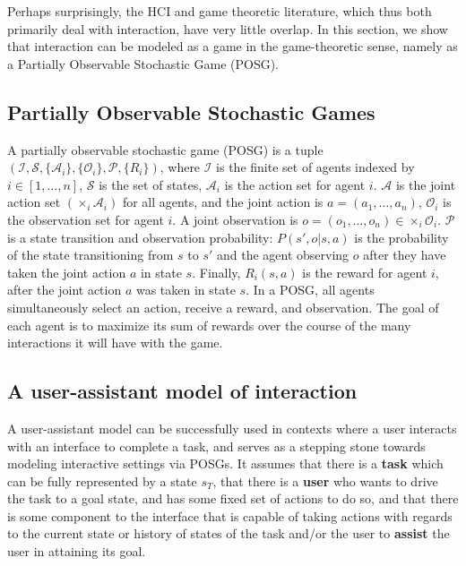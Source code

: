 \documentclass[12pt,a4paper]{article}
\begin{document}
Perhaps surprisingly, the HCI and game theoretic literature, which thus both primarily deal with interaction, have very little overlap. In this section, we show that interaction can be modeled as a game in the game-theoretic sense, namely as a Partially Observable Stochastic Game (POSG).
\subsection{Partially Observable Stochastic Games}
A partially observable stochastic game (POSG) is a tuple $(\mathcal{I}, \mathcal{S}, \lbrace \mathcal{A}_i \rbrace, \lbrace \mathcal{O}_i \rbrace, \mathcal{P}, \lbrace R_i \rbrace )$, where $\mathcal{I}$ is the finite set of agents indexed by $i \in [1,\dots,n]$, $\mathcal{S}$ is the set of states, $\mathcal{A}_i$ is the action set for agent $i$. $\mathcal{A}$ is the joint action set $(\times_{i} \mathcal{A}_i)$ for all agents, and the joint action is $a = (a_1, \dots{}, a_n)$, $\mathcal{O}_i$  is the observation set for agent $i$. A joint observation is $o=(o_1, \dots{}, o_n) \in \times_i \mathcal{O}_i$. $\mathcal{P}$ is a state transition and observation probability: $P(s', o| s, a)$ is the probability of the state transitioning from $s$ to $s'$ and the agent observing $o$ after they have taken the joint action $a$ in state $s$.
Finally, $R_i(s,a)$ is the reward for agent $i$, after the joint action $a$ was taken in state $s$.
In a POSG, all agents simultaneously select an action, receive a reward, and observation. The goal of each agent is to maximize its sum of rewards over the course of the many interactions it will have with the game. 




\subsection{A user-assistant model of interaction}
A user-assistant model can be successfully used in contexts where a user interacts with an interface to complete a task, and serves as a stepping stone towards modeling interactive settings via POSGs. It assumes that there is a \textbf{task} which can be fully represented by a state \(s_T\), that there is a \textbf{user} who wants to drive the task to a goal state, and has some fixed set of actions to do so, and that there is some component to the interface that is capable of taking actions with regards to the current state or history of states of the task and/or the user to \textbf{assist} the user in attaining its goal.
\end{document}

